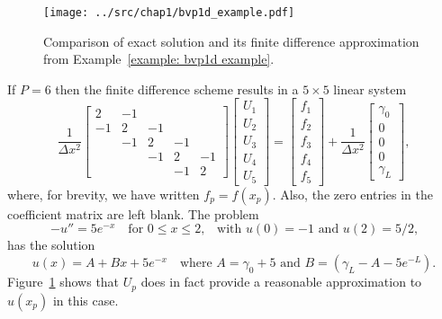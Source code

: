 \begin{figure}
\caption{Comparison of exact solution and its finite difference approximation
from Example~\ref{example: bvp1d example}.}\label{fig: bvp1d example}
\begin{center}
\texttt{[image: ../src/chap1/bvp1d\_example.pdf]}
\end{center}
\end{figure}

\begin{example}\label{example: bvp1d example}
If $P=6$ then the finite difference scheme results in a $5\times5$ 
linear system
\begin{equation}\label{eq: model 1d linear system}
\frac{1}{\Delta x^2}\begin{bmatrix}
 2&-1&  & &\\
-1& 2&-1& &\\
  &-1& 2&-1&\\
  &  &-1& 2&-1\\
  &  &  &-1& 2
\end{bmatrix}
\begin{bmatrix}U_1\\ U_2\\ U_3\\ U_4\\ U_5\end{bmatrix}
=\begin{bmatrix}f_1\\ f_2\\ f_3\\ f_4\\ f_5 \end{bmatrix}
+\frac{1}{\Delta x^2}
\begin{bmatrix}\gamma_0\\ 0\\ 0 \\ 0\\ \gamma_L \end{bmatrix},
\end{equation}
where, for brevity, we have written $f_p=f(x_p)$.  Also, the zero entries in 
the coefficient matrix are left blank.  The problem
\[
-u''=5e^{-x}\quad\text{for $0\le x\le2$,}
    \quad\text{with $u(0)=-1$ and $u(2)=5/2$,}
\]
has the solution
\[
u(x)=A+Bx+5e^{-x}\quad
\text{where $A=\gamma_0+5$ and $B=(\gamma_L-A-5e^{-L})$.}
\]
Figure~\ref{fig: bvp1d example} shows that $U_p$ does in fact provide a 
reasonable approximation to~$u(x_p)$ in this case.
\end{example}

